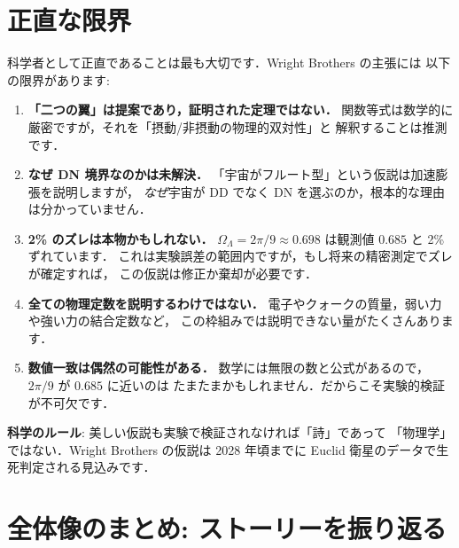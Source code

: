 \documentclass[11pt,a4paper]{article}
\begin{document}
\section{正直な限界}

科学者として正直であることは最も大切です．Wright Brothers の主張には
以下の限界があります:

\begin{enumerate}
\item \textbf{「二つの翼」は提案であり，証明された定理ではない．}
関数等式は数学的に厳密ですが，それを「摂動/非摂動の物理的双対性」と
解釈することは推測です．

\item \textbf{なぜ DN 境界なのかは未解決．}
「宇宙がフルート型」という仮説は加速膨張を説明しますが，
\emph{なぜ}宇宙が DD でなく DN を選ぶのか，根本的な理由は分かっていません．

\item \textbf{2\% のズレは本物かもしれない．}
$\Omega_\Lambda = 2\pi/9 \approx 0.698$ は観測値 $0.685$ と 2\% ずれています．
これは実験誤差の範囲内ですが，もし将来の精密測定でズレが確定すれば，
この仮説は修正か棄却が必要です．

\item \textbf{全ての物理定数を説明するわけではない．}
電子やクォークの質量，弱い力や強い力の結合定数など，
この枠組みでは説明できない量がたくさんあります．

\item \textbf{数値一致は偶然の可能性がある．}
数学には無限の数と公式があるので，$2\pi/9$ が $0.685$ に近いのは
たまたまかもしれません．だからこそ実験的検証が不可欠です．
\end{enumerate}

\begin{tcolorbox}[colback=red!5,colframe=red!50!black]
\textbf{科学のルール}: 美しい仮説も実験で検証されなければ「詩」であって
「物理学」ではない．Wright Brothers の仮説は 2028 年頃までに
Euclid 衛星のデータで生死判定される見込みです．
\end{tcolorbox}

\section{全体像のまとめ: ストーリーを振り返る}
\end{document}
